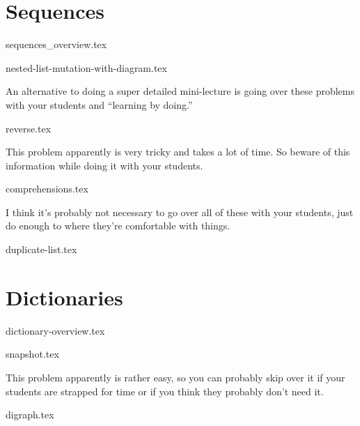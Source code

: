 \documentclass{exam}
\begin{document}
\section{Sequences}
{sequences_overview.tex}
\begin{questions}
    {nested-list-mutation-with-diagram.tex}
    \begin{questionmeta}
        An alternative to doing a super detailed mini-lecture is going over these problems with your students and ``learning by doing.'' 
    \end{questionmeta}
    {reverse.tex}
    \begin{questionmeta}
        This problem apparently is very tricky and takes a lot of time. So beware of this information while doing it with your students. 
    \end{questionmeta}
    {comprehensions.tex}
    \begin{questionmeta}
        I think it's probably not necessary to go over all of these with your students, just do enough to where they're comfortable with things. 
    \end{questionmeta}
    {duplicate-list.tex}
\end{questions}

\section{Dictionaries}
{dictionary-overview.tex}
\begin{questions}
    {snapshot.tex}
    \begin{questionmeta}
        This problem apparently is rather easy, so you can probably skip over it if your students are strapped for time or if you think they probably don't need it. 
    \end{questionmeta}
    {digraph.tex}
\end{questions}
\end{document}
